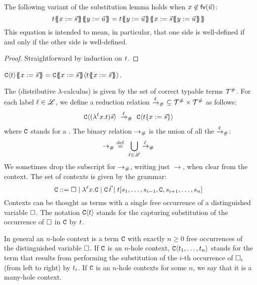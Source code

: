 \begin{lemma}
The following variant of the substitution lemma holds
when $x \not\in \mathsf{fv}({\vec{u}})$:
\[
 \tm\sub{\var}{\ls{\tmtwo}}\sub{\vartwo}{\ls{\tmthree}} =
 \tm\sub{\vartwo}{\ls{\tmthree}}\sub{\var}{\ls{\tmtwo}\sub{\vartwo}{\ls{\tmthree}}}
\]
This equation is intended to mean, in particular, that one side is well-defined
if and only if the other side is well-defined.
\end{lemma}
\begin{proof}
Straightforward by induction on $t$.
\end{proof}

\begin{remark}
$\conof{\tm}\sub{\var}{\ls{\tmtwo}} = \con\sub{\var}{\ls{\tmtwo}}\of{\tm\sub{\var}{\ls{\tmtwo}}}$.
\end{remark}

\bigskip


\begin{definition}
The  (distributive $\lambda$-calculus)
is given by the set of correct typable terms $\mathcal{T}^{\mathtt{\#}}$.
For each label $\ell \in \mathscr{L}$, we define a reduction relation $\mathrel{\xrightarrow{\ell}_{\mathtt{\#}}}\ \subseteq \mathcal{T}^{\mathtt{\#}} \times \mathcal{T}^{\mathtt{\#}}$
as follows:
\[
  \conof{(\lamp{\lab}{\var}{\tm})\vec{\tmtwo}}
  \ \todistl{\lab}\ %
  \conof{\subs{\tm}{\var}{\vec{\tmtwo}}}
\]
where $\mathtt{C}$ stands for a .
The binary relation $\mathrel{\to_{\mathtt{\#}}}$ is the union of all the $\mathrel{\xrightarrow{\ell}_{\mathtt{\#}}}$:
\[
  \mathrel{\to_{\mathtt{\#}}} \ \overset{\mathrm{def}}{=}\ \bigcup_{\ell \in \mathscr{L}}\mathrel{\xrightarrow{\ell}_{\mathtt{\#}}}
\]
We sometimes drop the subscript for $\mathrel{\to_{\mathtt{\#}}}$, writing just $\to$, when clear from the context.
The set of contexts is given by the grammar:
\[
  \mathtt{C} ::= \Box \mid \lambda^{\ell} x. \mathtt{C} \mid \mathtt{C}\,\vec{t} \mid t[s_1,\hdots,s_{i-1},\mathtt{C},s_{i+1},\hdots,s_n]
\]
Contexts can be thought as terms with a single free occurrence of a distinguished variable $\Box$.
The notation $\mathtt{C}\langle t\rangle$ stands for the capturing substitution of the occurrence of $\Box$ in $\mathtt{C}$ by $t$.

In general an $n$-hole context is a term $\mathtt{C}$ with exactly $n \geq 0$ free occurrences of the distinguished variable $\Box$.
If $\mathtt{C}$ is an $n$-hole context, $\mathtt{C}\langle t_1,\hdots,t_n\rangle$ stands for the term
that results from performing the substitution of the $i$-th occurrence of $\Box_i$ (from left to right)
by $t_i$.
If $\mathtt{C}$ is an $n$-hole contexts for some $n$, we say that it is a many-hole context.
\end{definition}
